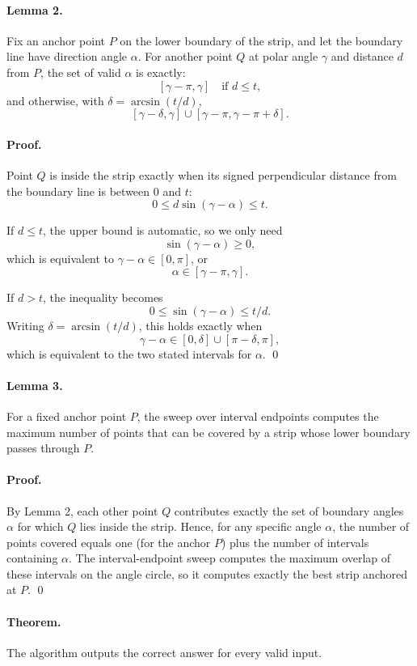 \documentclass[11pt]{article}
\begin{document}
\paragraph{Lemma 2.}
Fix an anchor point $P$ on the lower boundary of the strip, and let the boundary line have direction angle
$\alpha$.
For another point $Q$ at polar angle $\gamma$ and distance $d$ from $P$, the set of valid $\alpha$ is exactly:
\[
    [\gamma-\pi,\gamma] \quad \text{if } d \le t,
\]
and otherwise, with $\delta=\arcsin(t/d)$,
\[
    [\gamma-\delta,\gamma] \cup [\gamma-\pi,\gamma-\pi+\delta].
\]

\paragraph{Proof.}
Point $Q$ is inside the strip exactly when its signed perpendicular distance from the boundary line is
between $0$ and $t$:
\[
    0 \le d\sin(\gamma-\alpha) \le t.
\]

If $d \le t$, the upper bound is automatic, so we only need
\[
    \sin(\gamma-\alpha) \ge 0,
\]
which is equivalent to $\gamma-\alpha \in [0,\pi]$, or
\[
    \alpha \in [\gamma-\pi,\gamma].
\]

If $d > t$, the inequality becomes
\[
    0 \le \sin(\gamma-\alpha) \le t/d.
\]
Writing $\delta=\arcsin(t/d)$, this holds exactly when
\[
    \gamma-\alpha \in [0,\delta] \cup [\pi-\delta,\pi],
\]
which is equivalent to the two stated intervals for $\alpha$. \qed

\paragraph{Lemma 3.}
For a fixed anchor point $P$, the sweep over interval endpoints computes the maximum number of points that
can be covered by a strip whose lower boundary passes through $P$.

\paragraph{Proof.}
By Lemma 2, each other point $Q$ contributes exactly the set of boundary angles $\alpha$ for which $Q$ lies
inside the strip.
Hence, for any specific angle $\alpha$, the number of points covered equals one (for the anchor $P$) plus
the number of intervals containing $\alpha$.
The interval-endpoint sweep computes the maximum overlap of these intervals on the angle circle, so it
computes exactly the best strip anchored at $P$. \qed

\paragraph{Theorem.}
The algorithm outputs the correct answer for every valid input.
\end{document}
